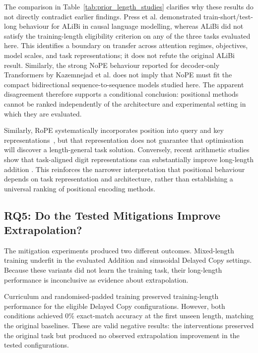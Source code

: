 \documentclass[
    author={Aanchala Ravindra Bhongade},
    supervisor={Dr. Fernando Moreno-Pino},
    degree={MSc},
    title={Length Generalisation in Transformer-Based Sequence Models: Failure Taxonomy and Mitigation Strategies},
    subtitle={},
    type={},
    year={2026}
]{dissertation}
\begin{document}
The comparison in Table~\ref{tab:prior_length_studies} clarifies why these results do not directly contradict earlier findings. Press et al. \cite{press2022train} demonstrated train-short/test-long behaviour for ALiBi in causal language modelling, whereas ALiBi did not satisfy the training-length eligibility criterion on any of the three tasks evaluated here. This identifies a boundary on transfer across attention regimes, objectives, model scales, and task representations; it does not refute the original ALiBi result. Similarly, the strong NoPE behaviour reported for decoder-only Transformers by Kazemnejad et al. \cite{kazemnejad2023impact} does not imply that NoPE must fit the compact bidirectional sequence-to-sequence models studied here. The apparent disagreement therefore supports a conditional conclusion: positional methods cannot be ranked independently of the architecture and experimental setting in which they are evaluated.

Similarly, RoPE systematically incorporates position into query and key representations~\cite{su2021roformer}, but that representation does not guarantee that optimisation will discover a length-general task solution. Conversely, recent arithmetic studies show that task-aligned digit representations can substantially improve long-length addition \cite{lee2024teaching,mcleish2024arithmetic}. This reinforces the narrower interpretation that positional behaviour depends on task representation and architecture, rather than establishing a universal ranking of positional encoding methods.

\subsection{RQ5: Do the Tested Mitigations Improve Extrapolation?}

The mitigation experiments produced two different outcomes. Mixed-length training underfit in the evaluated Addition and sinusoidal Delayed Copy settings. Because these variants did not learn the training task, their long-length performance is inconclusive as evidence about extrapolation.

Curriculum and randomised-padded training preserved training-length
performance for the eligible Delayed Copy configurations. However, both conditions achieved 0\% exact-match accuracy at the first unseen length, matching the original baselines. These are valid negative results: the interventions preserved the original task but produced no observed extrapolation improvement in the tested configurations.
\end{document}
